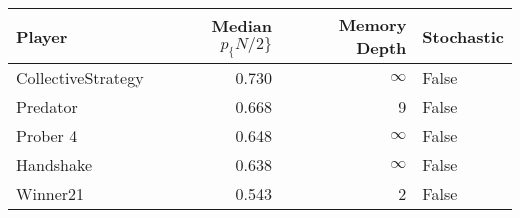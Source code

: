 \begin{tabular}{lrrl}
\toprule
             Player &  Median $p_\{N/2\}$ &  Memory Depth & Stochastic \\
\midrule
 CollectiveStrategy &             0.730 &            \(\infty\) &      False \\
           Predator &             0.668 &             9 &      False \\
           Prober 4 &             0.648 &            \(\infty\) &      False \\
          Handshake &             0.638 &            \(\infty\) &      False \\
           Winner21 &             0.543 &             2 &      False \\
\bottomrule
\end{tabular}

